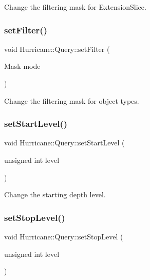 Change the filtering mask for Extension\+Slice. \mbox{\label{classHurricane_1_1Query_a457a0cda5ea5ad849a46aefce2514963}} 
\subsubsection{\texorpdfstring{set\+Filter()}{setFilter()}}
{\footnotesize\ttfamily void Hurricane\+::\+Query\+::set\+Filter (\begin{DoxyParamCaption}\item[{Mask}]{mode }\end{DoxyParamCaption})\hspace{0.3cm}{\ttfamily [inline]}}

Change the filtering mask for object types. \mbox{\label{classHurricane_1_1Query_a8c4bc1bcfae942042ccb90a46b6fb510}} 
\subsubsection{\texorpdfstring{set\+Start\+Level()}{setStartLevel()}}
{\footnotesize\ttfamily void Hurricane\+::\+Query\+::set\+Start\+Level (\begin{DoxyParamCaption}\item[{unsigned int}]{level }\end{DoxyParamCaption})\hspace{0.3cm}{\ttfamily [inline]}}

Change the starting depth level. \mbox{\label{classHurricane_1_1Query_a70359c71d7dc7e3f17d0a29c8208c92f}} 
\subsubsection{\texorpdfstring{set\+Stop\+Level()}{setStopLevel()}}
{\footnotesize\ttfamily void Hurricane\+::\+Query\+::set\+Stop\+Level (\begin{DoxyParamCaption}\item[{unsigned int}]{level }\end{DoxyParamCaption})\hspace{0.3cm}{\ttfamily [inline]}}

